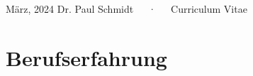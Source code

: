 \documentclass[11pt,a4paper,]{awesome-cv}
\begin{document}
\makecvheader

\makecvfooter
  {März, 2024}
    {Dr. Paul Schmidt~~~·~~~Curriculum Vitae}
  {\thepage}






\hypertarget{berufserfahrung}{%
\section{Berufserfahrung}\label{berufserfahrung}}
\end{document}
